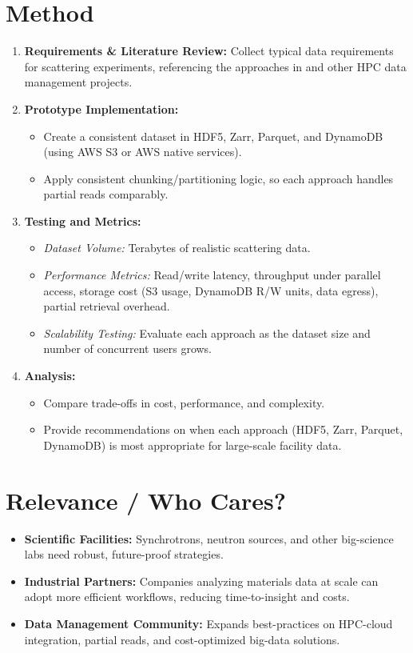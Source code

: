 \documentclass{article}
\begin{document}
\section{Method}
\begin{enumerate}
    \item \textbf{Requirements \& Literature Review:} 
    Collect typical data requirements for scattering experiments, referencing the approaches in \cite{wang2018synchrotron, meyer2014store, moriyama2019public, kek2021aws, godoy2021efficient} and other HPC data management projects.

    \item \textbf{Prototype Implementation:}
    \begin{itemize}
        \item Create a consistent dataset in HDF5, Zarr, Parquet, and DynamoDB (using AWS S3 or AWS native services).
        \item Apply consistent chunking/partitioning logic, so each approach handles partial reads comparably.
    \end{itemize}

    \item \textbf{Testing and Metrics:}
    \begin{itemize}
        \item \emph{Dataset Volume:} Terabytes of realistic scattering data.
        \item \emph{Performance Metrics:} Read/write latency, throughput under parallel access, storage cost (S3 usage, DynamoDB R/W units, data egress), partial retrieval overhead.
        \item \emph{Scalability Testing:} Evaluate each approach as the dataset size and number of concurrent users grows.
    \end{itemize}

    \item \textbf{Analysis:}
    \begin{itemize}
        \item Compare trade-offs in cost, performance, and complexity. 
        \item Provide recommendations on when each approach (HDF5, Zarr, Parquet, DynamoDB) is most appropriate for large-scale facility data.
    \end{itemize}
\end{enumerate}

\section{Relevance / Who Cares?}
\begin{itemize}
    \item \textbf{Scientific Facilities:} Synchrotrons, neutron sources, and other big-science labs need robust, future-proof strategies.
    \item \textbf{Industrial Partners:} Companies analyzing materials data at scale can adopt more efficient workflows, reducing time-to-insight and costs.
    \item \textbf{Data Management Community:} Expands best-practices on HPC-cloud integration, partial reads, and cost-optimized big-data solutions.
\end{itemize}
\end{document}
